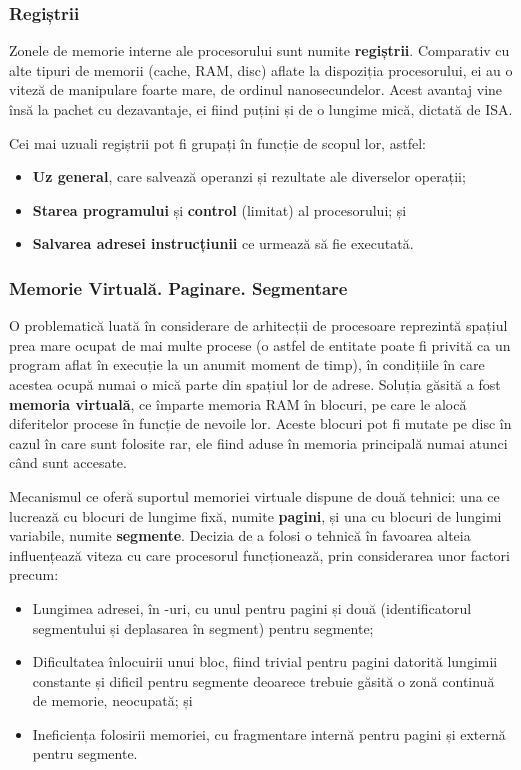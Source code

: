 \documentclass[../../main.tex]{subfiles}
\begin{document}
\subsubsection{Regiștrii}

Zonele de memorie interne ale procesorului sunt numite \textbf{regiștrii}. Comparativ cu alte tipuri de memorii (cache, RAM, disc) aflate la dispoziția procesorului, ei au o viteză de manipulare foarte mare, de ordinul nanosecundelor. Acest avantaj vine însă la pachet cu dezavantaje, ei fiind puțini și de o lungime mică, dictată de ISA.

Cei mai uzuali regiștrii pot fi grupați în funcție de scopul lor, astfel:
\begin{itemize}
    \item \textbf{Uz general}, care salvează operanzi și rezultate ale diverselor operații;
    \item \textbf{Starea programului} și \textbf{control} (limitat) al procesorului; și
    \item \textbf{Salvarea adresei instrucțiunii} ce urmează să fie executată.
\end{itemize}

\subsubsection{Memorie Virtuală. Paginare. Segmentare}

O problematică luată în considerare de arhitecții de procesoare reprezintă spațiul prea mare ocupat de mai multe procese (o astfel de entitate poate fi privită ca un program aflat în execuție la un anumit moment de timp), în condițiile în care acestea ocupă numai o mică parte din spațiul lor de adrese. Soluția găsită a fost \textbf{memoria virtuală}, ce împarte memoria RAM în blocuri, pe care le alocă diferitelor procese în funcție de nevoile lor. Aceste blocuri pot fi mutate pe disc în cazul în care sunt folosite rar, ele fiind aduse în memoria principală numai atunci când sunt accesate.

Mecanismul ce oferă suportul memoriei virtuale dispune de două tehnici: una ce lucrează cu blocuri de lungime fixă, numite \textbf{pagini}, și una cu blocuri de lungimi variabile, numite \textbf{segmente}. Decizia de a folosi o tehnică în favoarea alteia influențează viteza cu care procesorul funcționează, prin considerarea unor factori precum:
\begin{itemize}
    \item Lungimea adresei, în -uri, cu unul pentru pagini și două (identificatorul segmentului și deplasarea în segment) pentru segmente;
    \item Dificultatea înlocuirii unui bloc, fiind trivial pentru pagini datorită lungi\-mii constante și dificil pentru segmente deoarece trebuie găsită o zonă continuă de memorie, neocupată; și
    \item Ineficiența folosirii memoriei, cu fragmentare internă pentru pagini și externă pentru segmente.
\end{itemize}
\end{document}
